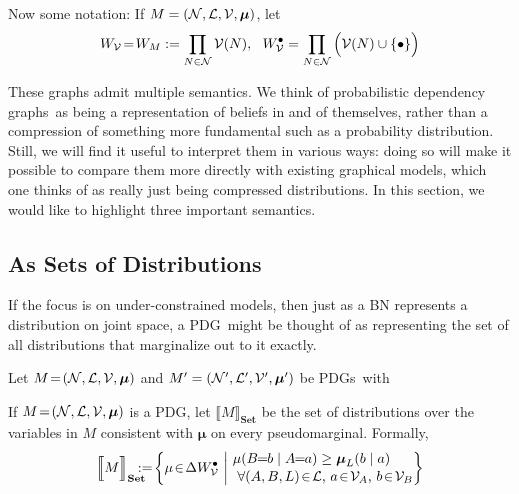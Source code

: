 \documentclass{article}
\newcommand\Set{\textbf{Set}}
\newcommand{\modelname}{probabilistic dependency graph}
\newcommand{\modelnames}{\modelname s}
\newcommand{\MN}{PDG}
\newcommand{\MNs}{\MN s}
\def\seq{\!=\!}
\begin{document}
	Now some notation: If $M = \mnvars[]$, let 
	$$W_{\cal V} \seq W_M :=  \prod_{N \in \mathcal N}\mathcal V(N),~~ W_{\cal V}^\bullet = \prod_{N \in \mathcal N}\Big(\mathcal V(N) \cup \{\bullet\} \Big)$$
			
	These graphs admit multiple semantics. We think of \modelnames\ as being a representation of beliefs in and of themselves, rather than a compression of something more fundamental such as a probability distribution. Still, we will find it useful to interpret them in various ways: doing so will make it possible to compare them more directly with existing graphical models, which one thinks of as really just being compressed distributions. In this section, we would like to highlight three important semantics.
	
	\subsection{As Sets of Distributions}\label{sec:set-of-distribution-semantics}
	If the focus is on under-constrained models, then just as a BN represents a distribution on joint space, a \MN\ might be thought of as representing the set of all distributions that marginalize out to it exactly. 
	
	
	\begin{defn}
		Let $M \!=\!\mnvars[]$ and $M'= \mnvars[']$ be \MNs\ with 
	\end{defn}
	

	
	\begin{defn}
		If $M\seq\mnvars[]$ is a \MN, let $\llbracket M \rrbracket_\Set$ be the set of distributions over the variables in $M$ consistent with $\boldsymbol\mu$ on every pseudomarginal. Formally,		
		\[ \Big\llbracket M \Big\rrbracket_\Set \hspace{-2ex} := \!\left\{\mu \!\in\! \Delta W_{\cal V}^\bullet\ \middle|\!
		\begin{array}{l}
		\mu(B\!\! =\!\!b \mid A\!\!=\!\!a) \geq \boldsymbol\mu_L(b \mid a) \\[0.1em]
		~\text{$\forall (A, B, L) \!\in\! \mathcal L$, $a \!\in\!\mathcal V_A$, $b \!\in\! \mathcal V_B$} \end{array}\!\!\! \right\}\]
	\end{defn}
	
\end{document}
